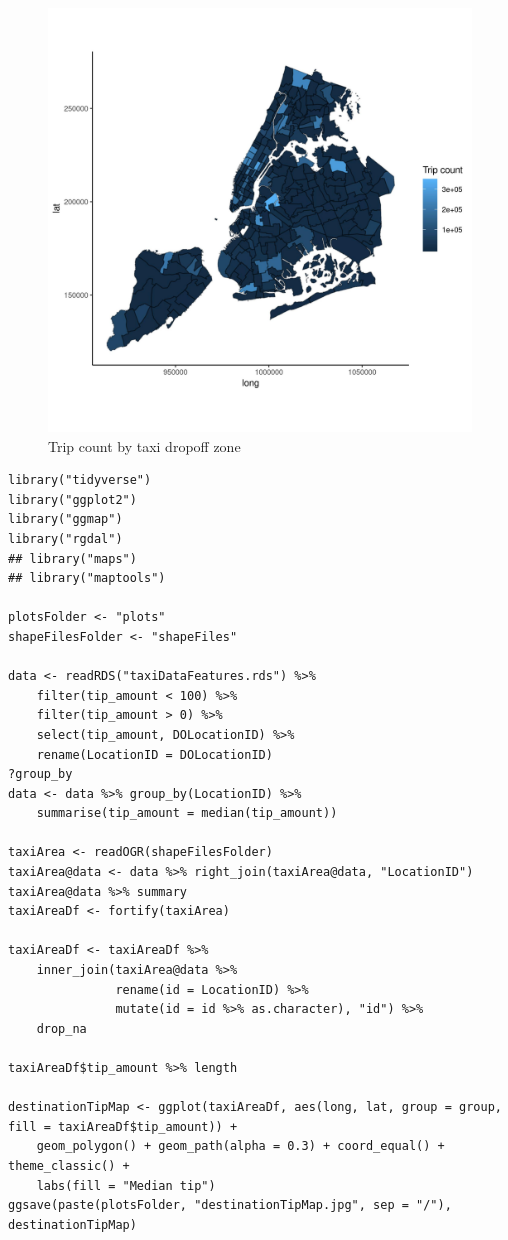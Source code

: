 \documentclass[11pt]{article}
\begin{document}
\begin{figure}[htbp]
\centering
\includegraphics[width=.9\linewidth]{./plots/destinationTripsMap.jpg}
\caption{\label{fig:org3bfab40}
Trip count by taxi dropoff zone}
\end{figure}

\begin{verbatim}
library("tidyverse")
library("ggplot2")
library("ggmap")
library("rgdal")
## library("maps")
## library("maptools")

plotsFolder <- "plots"
shapeFilesFolder <- "shapeFiles"

data <- readRDS("taxiDataFeatures.rds") %>%
    filter(tip_amount < 100) %>%
    filter(tip_amount > 0) %>%
    select(tip_amount, DOLocationID) %>%
    rename(LocationID = DOLocationID)
?group_by
data <- data %>% group_by(LocationID) %>%
    summarise(tip_amount = median(tip_amount))

taxiArea <- readOGR(shapeFilesFolder)
taxiArea@data <- data %>% right_join(taxiArea@data, "LocationID")
taxiArea@data %>% summary
taxiAreaDf <- fortify(taxiArea)

taxiAreaDf <- taxiAreaDf %>%
    inner_join(taxiArea@data %>%
               rename(id = LocationID) %>%
               mutate(id = id %>% as.character), "id") %>%
    drop_na

taxiAreaDf$tip_amount %>% length

destinationTipMap <- ggplot(taxiAreaDf, aes(long, lat, group = group, fill = taxiAreaDf$tip_amount)) +
    geom_polygon() + geom_path(alpha = 0.3) + coord_equal() + theme_classic() +
    labs(fill = "Median tip")
ggsave(paste(plotsFolder, "destinationTipMap.jpg", sep = "/"), destinationTipMap)

\end{verbatim}
\end{document}
